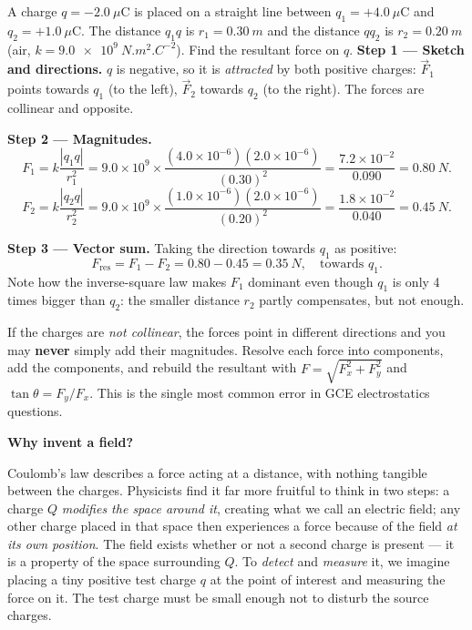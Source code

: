 \documentclass[11pt]{article}
\newcommand{\cle}[1]{{\popxbold\color{popdark}#1}}
\newcounter{popsec}
\newcounter{popsub}
\newcommand{\courssub}[1]{%
  \stepcounter{popsub}%
  \par\vspace{9pt}\noindent{\popxbold\fontsize{11.5}{13}\selectfont\color{popink}{\color{poporange}\thepopsec.\thepopsub}\hspace{6pt}#1}\par\nopagebreak\vspace{4pt}
}
\begin{document}
\begin{exoresolu}
A charge $q=-2.0\ \mu\mathrm{C}$ is placed on a straight line between $q_1=+4.0\ \mu\mathrm{C}$ and $q_2=+1.0\ \mu\mathrm{C}$. The distance $q_1q$ is $r_1=\SI{0.30}{m}$ and the distance $qq_2$ is $r_2=\SI{0.20}{m}$ (air, $k=\SI{9.0e9}{N.m^2.C^{-2}}$). Find the resultant force on $q$.
\tcblower
\textbf{Step 1 — Sketch and directions.} $q$ is negative, so it is \emph{attracted} by both positive charges: $\vec{F}_1$ points towards $q_1$ (to the left), $\vec{F}_2$ towards $q_2$ (to the right). The forces are collinear and opposite.

\textbf{Step 2 — Magnitudes.}
\[
F_1=k\frac{|q_1q|}{r_1^2}=9.0\times10^{9}\times\frac{(4.0\times10^{-6})(2.0\times10^{-6})}{(0.30)^2}
=\frac{7.2\times10^{-2}}{0.090}=\SI{0.80}{N}.
\]
\[
F_2=k\frac{|q_2q|}{r_2^2}=9.0\times10^{9}\times\frac{(1.0\times10^{-6})(2.0\times10^{-6})}{(0.20)^2}
=\frac{1.8\times10^{-2}}{0.040}=\SI{0.45}{N}.
\]

\textbf{Step 3 — Vector sum.} Taking the direction towards $q_1$ as positive:
\[
F_{\text{res}}=F_1-F_2=0.80-0.45=\SI{0.35}{N},\quad\text{towards } q_1.
\]
Note how the inverse-square law makes $F_1$ dominant even though $q_1$ is only 4 times bigger than $q_2$: the smaller distance $r_2$ partly compensates, but not enough.
\end{exoresolu}

\begin{attention}
If the charges are \emph{not collinear}, the forces point in different directions and you may \textbf{never} simply add their magnitudes. Resolve each force into components, add the components, and rebuild the resultant with $F=\sqrt{F_x^2+F_y^2}$ and $\tan\theta=F_y/F_x$. This is the single most common error in GCE electrostatics questions.
\end{attention}

\courssub{The Concept of Electric Field}

\textbf{Why invent a field?}\par
Coulomb's law describes a force acting at a distance, with nothing tangible between the charges. Physicists find it far more fruitful to think in two steps: a charge $Q$ \emph{modifies the space around it}, creating what we call an \cle{electric field}; any other charge placed in that space then experiences a force because of the field \emph{at its own position}. The field exists whether or not a second charge is present — it is a property of the space surrounding $Q$. To \emph{detect} and \emph{measure} it, we imagine placing a tiny positive \cle{test charge} $q$ at the point of interest and measuring the force on it. The test charge must be small enough not to disturb the source charges.
\end{document}
